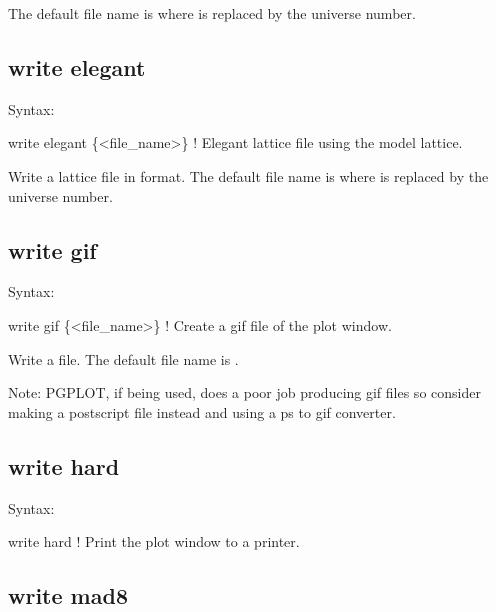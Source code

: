 {{{{{{{{{{{The default file name is  where \vn{\#} is replaced by the universe number. 



\subsection{write elegant}
\label{s:write.elegant}

Syntax:
\begin{example}
    write elegant \{<file_name>\}           ! Elegant lattice file using the model lattice.
\end{example}

Write a lattice file in  format. The default file name is  where \vn{\#}
is replaced by the universe number.


\subsection{write gif}
\label{s:write.gif}

Syntax:
\begin{example}
    write gif \{<file_name>\}           ! Create a gif file of the plot window.
\end{example}

Write a  file. The default file name is .

Note: PGPLOT, if being used, does a poor job producing gif files so consider making a
postscript file instead and using a ps to gif converter.


\subsection{write hard}
\label{s:write.hard}

Syntax:
\begin{example}
    write hard                        ! Print the plot window to a printer.
\end{example}


\subsection{write mad8}
\label{s:write.mad8}

}}}}}}}}}}}
